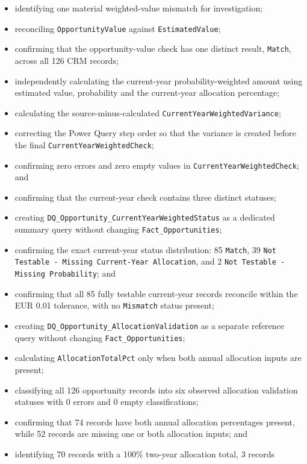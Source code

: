 \documentclass[11pt,a4paper]{article}
\begin{document}
\begin{itemize}[leftmargin=7mm,itemsep=3pt]
    \item identifying one material weighted-value mismatch for investigation;
    \item reconciling \texttt{OpportunityValue} against \texttt{EstimatedValue};
    \item confirming that the opportunity-value check has one distinct result,
    \texttt{Match}, across all 126 CRM records;
    \item independently calculating the current-year probability-weighted amount
    using estimated value, probability and the current-year allocation percentage;
    \item calculating the source-minus-calculated
    \texttt{CurrentYearWeightedVariance};
    \item correcting the Power Query step order so that the variance is created
    before the final \texttt{CurrentYearWeightedCheck};
    \item confirming zero errors and zero empty values in
    \texttt{CurrentYearWeightedCheck}; and
    \item confirming that the current-year check contains three distinct statuses;
    \item creating \texttt{DQ\_Opportunity\_CurrentYearWeightedStatus} as a dedicated
    summary query without changing \texttt{Fact\_Opportunities};
    \item confirming the exact current-year status distribution: 85 \texttt{Match},
    39 \texttt{Not Testable - Missing Current-Year Allocation}, and
    2 \texttt{Not Testable - Missing Probability}; and
    \item confirming that all 85 fully testable current-year records reconcile within
    the EUR 0.01 tolerance, with no \texttt{Mismatch} status present;
    \item creating \texttt{DQ\_Opportunity\_AllocationValidation} as a separate
    reference query without changing \texttt{Fact\_Opportunities};
    \item calculating \texttt{AllocationTotalPct} only when both annual allocation
    inputs are present;
    \item classifying all 126 opportunity records into six observed allocation
    validation statuses with 0 errors and 0 empty classifications;
    \item confirming that 74 records have both annual allocation percentages present,
    while 52 records are missing one or both allocation inputs; and
    \item identifying 70 records with a 100\% two-year allocation total, 3 records

\end{itemize}
\end{document}
